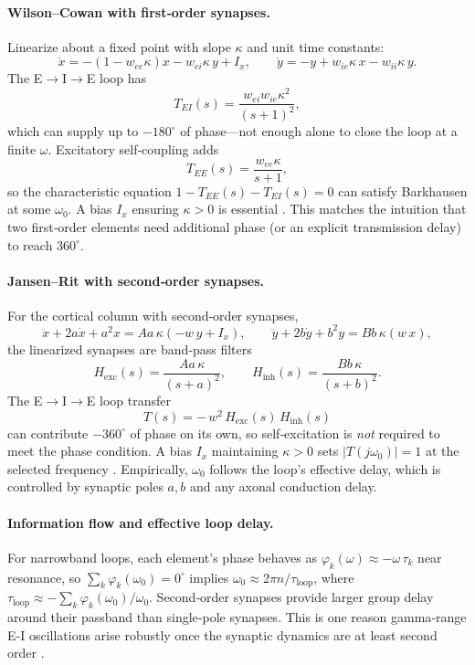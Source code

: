 \paragraph{Wilson--Cowan with first‑order synapses.}
Linearize about a fixed point with slope \(\kappa\) and unit time constants:
\[
\dot{x}=-(1-w_{ee}\kappa)x - w_{ei}\kappa\,y + I_x,\qquad
\dot{y}=-y + w_{ie}\kappa\,x - w_{ii}\kappa\,y.
\]
The E\(\to\)I\(\to\)E loop has
\[
T_{EI}(s)=\frac{w_{ei}w_{ie}\kappa^2}{(s+1)^2},
\]
which can supply up to \(-180^\circ\) of phase---not enough alone to close the loop at a finite \(\omega\). Excitatory self‑coupling adds
\[
T_{EE}(s)=\frac{w_{ee}\kappa}{s+1},
\]
so the characteristic equation \(1-T_{EE}(s)-T_{EI}(s)=0\) can satisfy Barkhausen at some \(\omega_0\). A bias \(I_x\) ensuring \(\kappa>0\) is essential \cite{WilsonCowan1972}. This matches the intuition that two first‑order elements need additional phase (or an explicit transmission delay) to reach \(360^\circ\).

\paragraph{Jansen--Rit with second‑order synapses.}
For the cortical column with second‑order synapses,
\[
\ddot{x}+2a\dot{x}+a^2 x=A a\,\kappa(-w\,y+I_x),\qquad
\ddot{y}+2b\dot{y}+b^2 y=B b\,\kappa(w\,x),
\]
the linearized synapses are band‑pass filters
\[
H_{\mathrm{exc}}(s)=\frac{A a\,\kappa}{(s+a)^2},\qquad
H_{\mathrm{inh}}(s)=\frac{B b\,\kappa}{(s+b)^2}.
\]
The E\(\to\)I\(\to\)E loop transfer
\[
T(s)=-\,w^2\,H_{\mathrm{exc}}(s)\,H_{\mathrm{inh}}(s)
\]
can contribute \(-360^\circ\) of phase on its own, so self‑excitation is \emph{not} required to meet the phase condition. A bias \(I_x\) maintaining \(\kappa>0\) sets \(|T(j\omega_0)|=1\) at the selected frequency  \cite{jansen1995}. Empirically, \(\omega_0\) follows the loop's effective delay, which is controlled by synaptic poles \(a,b\) and any axonal conduction delay.

\paragraph{Information flow and effective loop delay.}
For narrowband loops, each element's phase behaves as \(\varphi_k(\omega)\approx -\omega\,\tau_k\) near resonance, so \(\sum_k \varphi_k(\omega_0)=0^\circ\) implies \(\omega_0 \approx 2\pi n/\tau_{\mathrm{loop}}\), where \(\tau_{\mathrm{loop}}\approx -\sum_k \varphi_k(\omega_0)/\omega_0\). Second‑order synapses provide larger group delay around their passband than single‑pole synapses. This is one reason gamma‑range E-I oscillations arise robustly once the synaptic dynamics are at least second order  \cite{BuzsakiWang2012}.

